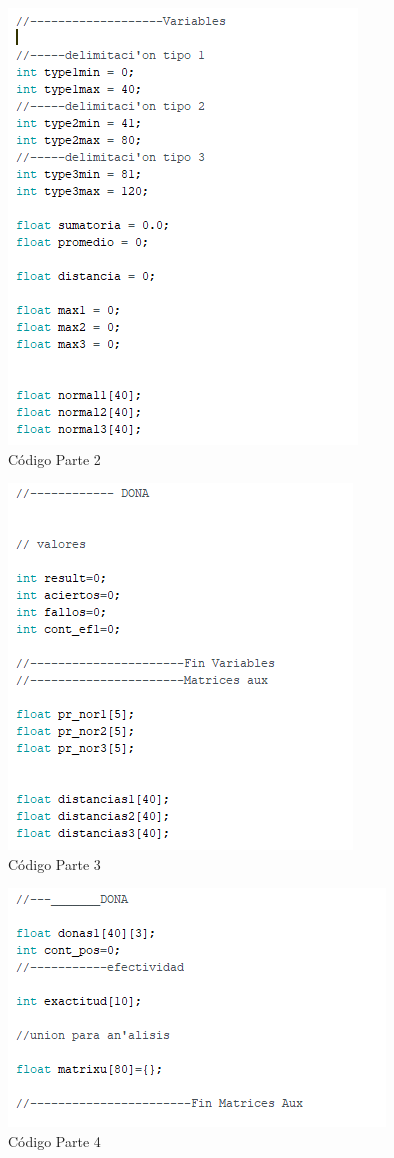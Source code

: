 \documentclass[10pt,a4paper]{article}
\begin{document}
\begin{figure}[H]
\caption{Código Parte 2}
\centering
\includegraphics[scale=0.9]{c2.png}
\end{figure}

\begin{figure}[H]
\caption{Código Parte 3}
\centering
\includegraphics[scale=0.9]{c3.png}
\end{figure}

\begin{figure}[H]
\caption{Código Parte 4}
\centering
\includegraphics[scale=0.9]{c4.png}
\end{figure}
\end{document}
